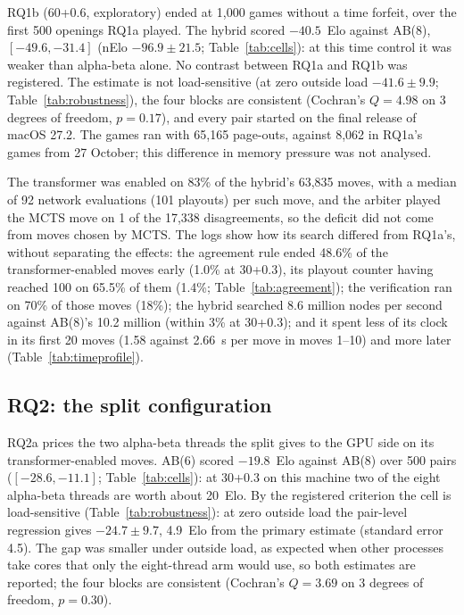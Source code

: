 \documentclass{article}
\begin{document}
RQ1b (60+0.6, exploratory) ended at 1{,}000 games without a time forfeit, over the first 500 openings RQ1a played. The hybrid scored $-40.5$~Elo against AB(8), $[-49.6, -31.4]$ (nElo $-96.9 \pm 21.5$; Table~\ref{tab:cells}): at this time control it was weaker than alpha-beta alone. No contrast between RQ1a and RQ1b was registered. The estimate is not load-sensitive (at zero outside load $-41.6 \pm 9.9$; Table~\ref{tab:robustness}), the four blocks are consistent (Cochran's $Q = 4.98$ on 3 degrees of freedom, $p = 0.17$), and every pair started on the final release of macOS 27.2. The games ran with 65{,}165 page-outs, against 8{,}062 in RQ1a's games from 27 October; this difference in memory pressure was not analysed.

The transformer was enabled on 83\% of the hybrid's 63{,}835 moves, with a median of 92 network evaluations (101 playouts) per such move, and the arbiter played the MCTS move on 1 of the 17{,}338 disagreements, so the deficit did not come from moves chosen by MCTS. The logs show how its search differed from RQ1a's, without separating the effects: the agreement rule ended 48.6\% of the transformer-enabled moves early (1.0\% at 30+0.3), its playout counter having reached 100 on 65.5\% of them (1.4\%; Table~\ref{tab:agreement}); the verification ran on 70\% of those moves (18\%); the hybrid searched 8.6 million nodes per second against AB(8)'s 10.2 million (within 3\% at 30+0.3); and it spent less of its clock in its first 20 moves (1.58 against 2.66~s per move in moves 1--10) and more later (Table~\ref{tab:timeprofile}).

\subsection{RQ2: the split configuration}
RQ2a prices the two alpha-beta threads the split gives to the GPU side on its transformer-enabled moves. AB(6) scored $-19.8$~Elo against AB(8) over 500 pairs ($[-28.6, -11.1]$; Table~\ref{tab:cells}): at 30+0.3 on this machine two of the eight alpha-beta threads are worth about 20~Elo. By the registered criterion the cell is load-sensitive (Table~\ref{tab:robustness}): at zero outside load the pair-level regression gives $-24.7 \pm 9.7$, 4.9~Elo from the primary estimate (standard error 4.5). The gap was smaller under outside load, as expected when other processes take cores that only the eight-thread arm would use, so both estimates are reported; the four blocks are consistent (Cochran's $Q = 3.69$ on 3 degrees of freedom, $p = 0.30$).
\end{document}
